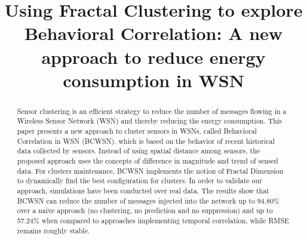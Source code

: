 \documentclass{acm_proc_article-sp}
\begin{document}
%

\title{Using Fractal Clustering to explore Behavioral Correlation: A new
approach to reduce energy consumption in WSN}



\maketitle


\begin{abstract}

Sensor clustering is an efficient strategy to reduce the number of messages
flowing in a Wireless Sensor Network (WSN) and thereby reducing the energy
consumption. This paper presents a new approach to cluster sensors in WSNs,
called Behavioral Correlation in WSN (BCWSN), which is based on the behavior of
recent historical data collected by sensors. Instead of using spatial distance
among sensors, the proposed approach uses the concepts of difference in
magnitude and trend of sensed data. For clusters maintenance, BCWSN implements
the notion of Fractal Dimension to dynamically find the best configuration for
clusters. In order to validate our approach, simulations have been conducted
over real data. The results show that BCWSN can reduce the number of messages
injected into the network up to 94.80\% over a naive approach (no clustering, no
prediction and no suppression) and up to 57.24\% when compared to approaches
implementing temporal correlation, while RMSE remains roughly stable.

\end{abstract}


\end{document}
